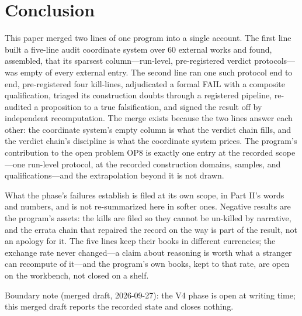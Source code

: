 \documentclass[11pt]{article}
\begin{document}
\section{Conclusion}
\label{sec:24}
\noindent This paper merged two lines of one program into a single account. The first line built a five-line audit coordinate system over 60 external works and found, assembled, that its sparsest column—run-level, pre-registered verdict protocols—was empty of every external entry. The second line ran one such protocol end to end, pre-registered four kill-lines, adjudicated a formal FAIL with a composite qualification, triaged its construction doubts through a registered pipeline, re-audited a proposition to a true falsification, and signed the result off by independent recomputation. The merge exists because the two lines answer each other: the coordinate system's empty column is what the verdict chain fills, and the verdict chain's discipline is what the coordinate system prices. The program's contribution to the open problem OP8 is exactly one entry at the recorded scope—one run-level protocol, at the recorded construction domains, samples, and qualifications—and the extrapolation beyond it is not drawn.\par
\noindent What the phase's failures establish is filed at its own scope, in Part II's words and numbers, and is not re-summarized here in softer ones. Negative results are the program's assets: the kills are filed so they cannot be un-killed by narrative, and the errata chain that repaired the record on the way is part of the result, not an apology for it. The five lines keep their books in different currencies; the exchange rate never changed—a claim about reasoning is worth what a stranger can recompute of it—and the program's own books, kept to that rate, are open on the workbench, not closed on a shelf.\par
\noindent Boundary note (merged draft, 2026-09-27): the V4 phase is open at writing time; this merged draft reports the recorded state and closes nothing.\par
\end{document}
